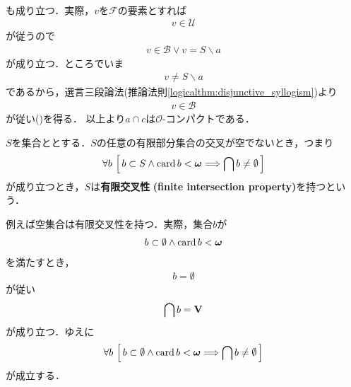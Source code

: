 \begin{sketch}
\begin{align}
			\label{fom:thm_closed_subset_of_compact_set_is_compact_on_Hausdorff_space_2}
		\end{align}
		も成り立つ．実際，$v$を$\mathscr{F}$の要素とすれば
		\begin{align}
			v \in \mathscr{U}
		\end{align}
		が従うので
		\begin{align}
			v \in \mathscr{B} \vee v = S \backslash a
		\end{align}
		が成り立つ．ところでいま
		\begin{align}
			v \neq S \backslash a
		\end{align}
		であるから，選言三段論法(推論法則\ref{logicalthm:disjunctive_syllogism})より
		\begin{align}
			v \in \mathscr{B}
		\end{align}
		が従い()を得る．
		以上より$a \cap c$は$\mathscr{O}$-コンパクトである．
		\QED
	\end{sketch}
	
	\begin{screen}
		\begin{dfn}[有限交叉性]
			$S$を集合ととする．$S$の任意の有限部分集合の交叉が空でないとき，つまり
			\begin{align}
				\forall b\, \left[\, b \subset S \wedge \operatorname{card} b < {\boldsymbol \omega}
				\Longrightarrow \bigcap b \neq \emptyset\, \right]
			\end{align}
			が成り立つとき，$S$は{\bf 有限交叉性}
			{\bf (finite intersection property)}を持つという．
		\end{dfn}
	\end{screen}
	
	例えば空集合は有限交叉性を持つ．実際，集合$b$が
	\begin{align}
		b \subset \emptyset \wedge \operatorname{card} b < {\boldsymbol \omega}
	\end{align}
	を満たすとき，
	\begin{align}
		b = \emptyset
	\end{align}
	が従い
	\begin{align}
		\bigcap b = \mathbf{V}
	\end{align}
	が成り立つ．ゆえに
	\begin{align}
		\forall b\, \left[\, b \subset \emptyset \wedge \operatorname{card} b < {\boldsymbol \omega}
		\Longrightarrow \bigcap b \neq \emptyset\, \right]
	\end{align}
	が成立する．
	
